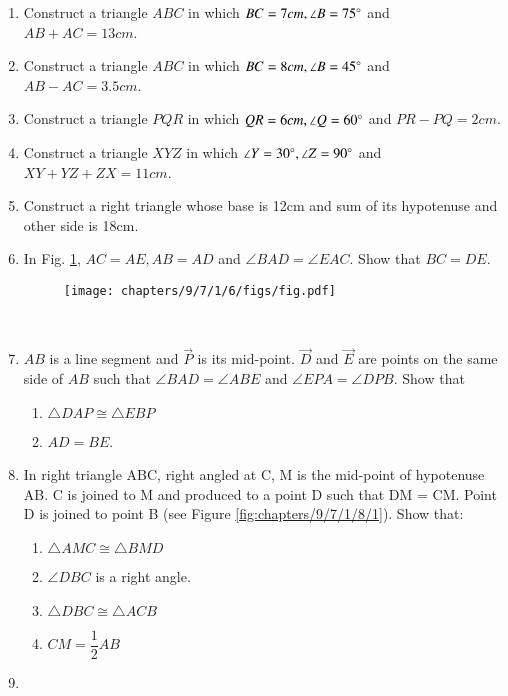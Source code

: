 \begin{enumerate}[label=\thesection.\arabic*,ref=\thesection.\theenumi]
\item Construct a triangle $ABC$ in which $BC=7cm, \angle{B}=75\degree$ and $AB + AC = 13 cm$.
\label{chapters/9/11/2/1}
%
%
\item Construct a triangle $ABC$ in which $BC=8cm, \angle{B}=45\degree$ and $AB - AC = 3.5 cm$.
\label{chapters/9/11/2/2}
\\
\solution

%
\item Construct a triangle $PQR$ in which $QR=6cm, \angle{Q}=60\degree$ and $PR - PQ = 2cm$.
\label{chapters/9/11/2/3}
%
%
\item Construct a triangle $XYZ$ in which $\angle{Y}=30\degree, \angle{Z}=90\degree$ and  $XY+YZ+ZX=11cm$.
\label{chapters/9/11/2/4}
%
%
\item Construct a right triangle whose base is 12cm and sum of its hypotenuse and other side is 18cm.
\label{chapters/9/11/2/5}
%
%
\item In Fig. \ref{fig:chapters/9/7/1/6/1}, $AC=AE,AB=AD$ and $\angle BAD=\angle EAC$. Show that $BC=DE$.
\label{chapters/9/7/1/6}
\begin{figure}[!h]
	\begin{center}
	\texttt{[image: chapters/9/7/1/6/figs/fig.pdf]}
	\end{center}
\caption{}
\label{fig:chapters/9/7/1/6/1}
\end{figure}
\\
\solution

\item 
	$AB$ is a line segment and $\vec{P}$ is its mid-point. $\vec{D}$ and $\vec{E}$ are points on the same side of
$AB$ such that $\angle BAD = \angle ABE$ and $\angle EPA = \angle DPB$. Show that
\label{chapters/9/7/1/7}
\begin{enumerate}
\item $\triangle DAP \cong \triangle EBP$
\item $AD = BE$.
\end{enumerate}
\solution

\item In right triangle ABC, right angled at C, M is the mid-point of hypotenuse AB. C is joined to M and produced to a point D such that DM = CM. Point D is joined to point B (see Figure \ref{fig:chapters/9/7/1/8/1}). Show that:
\begin{enumerate}
\item $\triangle AMC \cong \triangle BMD$
\item $\angle DBC$ is a right angle.
\item $\triangle DBC \cong \triangle ACB$
\item $CM = \dfrac{1}{2}AB$
\end{enumerate}
\label{chapters/9/7/1/8}

\item
%
\end{enumerate}
